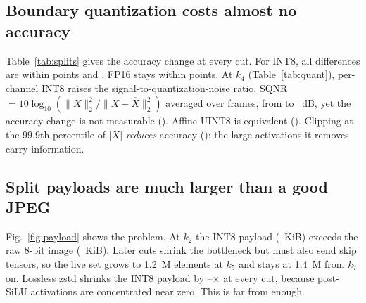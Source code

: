\documentclass[journal,twocolumn,10pt]{IEEEtran}
\begin{document}
\subsection{Boundary quantization costs almost no accuracy}\label{sec:accuracy}
Table~\ref{tab:splits} gives the accuracy change at every cut. For INT8, all differences are within \MaxAbsDeltaINT{} points and \SignificanceSentence. FP16 stays within \MaxAbsDeltaFPsixteen{} points. At $k_4$ (Table~\ref{tab:quant}), per-channel INT8 raises the signal-to-quantization-noise ratio, SQNR $=10\log_{10}(\|X\|_2^2/\|X-\hat X\|_2^2)$ averaged over frames, from \SQNRINT{} to \SQNRPerChannel{}~dB, yet the accuracy change is not measurable (\DeltaPerChannel). Affine UINT8 is equivalent (\DeltaUINT). Clipping at the 99.9th percentile of $|X|$ \emph{reduces} accuracy (\DeltaClip): the large activations it removes carry information.

\begin{table}[t]
\centering
\caption{Cuts of YOLOv8s: tensors sent, onboard compute, measured payload, and accuracy change on COCO val2017 (mAP@[.5:.95] points; 95\% paired-bootstrap CI).}
\label{tab:splits}

\end{table}

\begin{table}[t]
\centering
\caption{Wire precision at $k_4$ (real activations of \TimingImages{} frames; accuracy on \NumValImages{} images).}
\label{tab:quant}
\resizebox{\columnwidth}{!}{}
\end{table}

\subsection{Split payloads are much larger than a good JPEG}\label{sec:rate}
Fig.~\ref{fig:payload} shows the problem. At $k_2$ the INT8 payload (\PayloadINTKTwo~KiB) exceeds the raw 8-bit image (\RawImageKiB~KiB). Later cuts shrink the bottleneck but must also send skip tensors, so the live set grows to 1.2~M elements at $k_5$ and stays at 1.4~M from $k_7$ on. Lossless zstd shrinks the INT8 payload by \ZstdRatioMin--\ZstdRatioMax$\times$ at every cut, because post-SiLU activations are concentrated near zero. This is far from enough.
\end{document}
